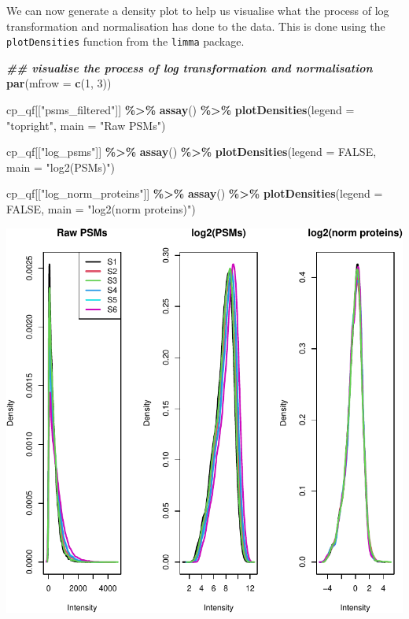 \documentclass[9pt,a4paper,]{extarticle}
\newenvironment{Shaded}{\begin{snugshade}}{\end{snugshade}}
\newcommand{\AttributeTok}[1]{\textcolor[rgb]{0.13,0.29,0.53}{#1}}
\newcommand{\ConstantTok}[1]{\textcolor[rgb]{0.56,0.35,0.01}{#1}}
\newcommand{\DecValTok}[1]{\textcolor[rgb]{0.00,0.00,0.81}{#1}}
\newcommand{\DocumentationTok}[1]{\textcolor[rgb]{0.56,0.35,0.01}{\textbf{\textit{#1}}}}
\newcommand{\FunctionTok}[1]{\textcolor[rgb]{0.13,0.29,0.53}{\textbf{#1}}}
\newcommand{\NormalTok}[1]{#1}
\newcommand{\SpecialCharTok}[1]{\textcolor[rgb]{0.81,0.36,0.00}{\textbf{#1}}}
\newcommand{\StringTok}[1]{\textcolor[rgb]{0.31,0.60,0.02}{#1}}
\begin{document}
We can now generate a density plot to help us visualise what the process of log
transformation and normalisation has done to the data. This is done using the
\texttt{plotDensities} function from the \texttt{limma} package.

\begin{Shaded}
\begin{Highlighting}[]
\DocumentationTok{\#\# visualise the process of log transformation and normalisation}
\FunctionTok{par}\NormalTok{(}\AttributeTok{mfrow =} \FunctionTok{c}\NormalTok{(}\DecValTok{1}\NormalTok{, }\DecValTok{3}\NormalTok{))}

\NormalTok{cp\_qf[[}\StringTok{"psms\_filtered"}\NormalTok{]] }\SpecialCharTok{\%\textgreater{}\%}
  \FunctionTok{assay}\NormalTok{() }\SpecialCharTok{\%\textgreater{}\%}
  \FunctionTok{plotDensities}\NormalTok{(}\AttributeTok{legend =} \StringTok{"topright"}\NormalTok{,}
                \AttributeTok{main =} \StringTok{"Raw PSMs"}\NormalTok{)}

\NormalTok{cp\_qf[[}\StringTok{"log\_psms"}\NormalTok{]] }\SpecialCharTok{\%\textgreater{}\%}
  \FunctionTok{assay}\NormalTok{() }\SpecialCharTok{\%\textgreater{}\%}
  \FunctionTok{plotDensities}\NormalTok{(}\AttributeTok{legend =} \ConstantTok{FALSE}\NormalTok{,}
                \AttributeTok{main =} \StringTok{"log2(PSMs)"}\NormalTok{)}

\NormalTok{cp\_qf[[}\StringTok{"log\_norm\_proteins"}\NormalTok{]] }\SpecialCharTok{\%\textgreater{}\%}
  \FunctionTok{assay}\NormalTok{() }\SpecialCharTok{\%\textgreater{}\%}
  \FunctionTok{plotDensities}\NormalTok{(}\AttributeTok{legend =} \ConstantTok{FALSE}\NormalTok{,}
                \AttributeTok{main =} \StringTok{"log2(norm proteins)"}\NormalTok{)}
\end{Highlighting}
\end{Shaded}

\begin{center}\includegraphics[width=0.9\linewidth]{workflow_expressions_files/figure-latex/tmt_transformations-1} \end{center}
\end{document}
